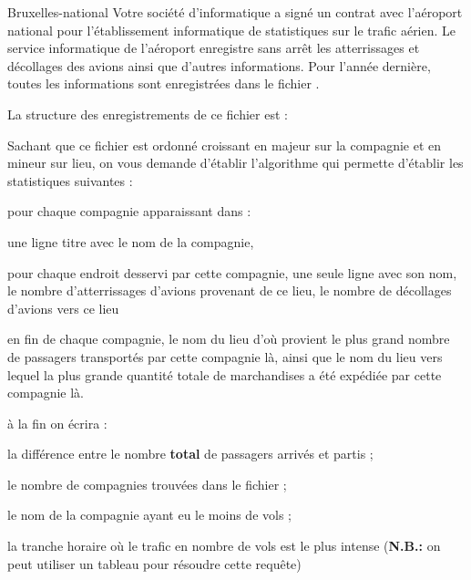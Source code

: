\begin{Exercice}{Bruxelles-national}
	Votre société d’informatique a signé un contrat avec l’aéroport national
	pour l’établissement informatique de statistiques sur le trafic aérien.
	Le service informatique de l’aéroport enregistre sans arrêt les
	atterrissages et décollages des avions ainsi que d’autres informations.
	Pour l’année dernière, toutes les informations sont enregistrées dans
	le fichier .

	La structure  des enregistrements de ce fichier est : 


	Sachant que ce fichier est ordonné croissant en majeur sur la compagnie
	et en mineur sur lieu, on vous demande d’établir l’algorithme qui
	permette d’établir les statistiques suivantes :

	\begin{liste}
		\item 
			pour chaque compagnie apparaissant dans  :
		\begin{liste}
			\item 
				une ligne titre avec le nom de la compagnie,
			\item 
				pour chaque endroit desservi par cette compagnie, une seule ligne avec
				son nom, le nombre d’atterrissages d’avions provenant de ce lieu, le
				nombre de décollages d’avions vers ce lieu
			\item 
				en fin de chaque compagnie, le nom du lieu d’où provient le plus grand
				nombre de passagers transportés par cette compagnie là, ainsi que le
				nom du lieu vers lequel la plus grande quantité totale de marchandises
				a été expédiée par cette compagnie là.
		\end{liste}
		\item 
			à la fin on écrira : 
		\begin{liste}
			\item 
				la différence entre le nombre \textbf{total} de passagers arrivés et
				partis ;
			\item 
				le nombre de compagnies trouvées dans le fichier ;
			\item 
				le nom de la compagnie ayant eu le moins de vols ;
			\item 
				la tranche horaire où le trafic en nombre de vols est le plus intense
				(\textbf{N.B.:} on peut utiliser un tableau pour résoudre cette
				requête)
		\end{liste}
	\end{liste}
	

\end{Exercice}
